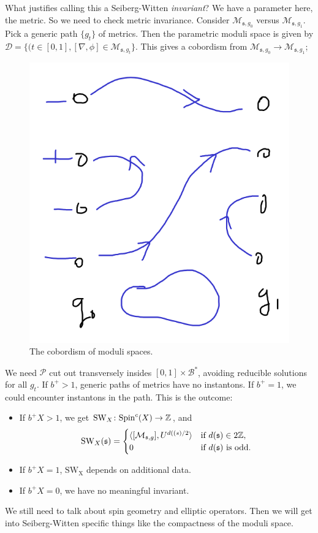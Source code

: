 What justifies calling this a Seiberg-Witten \emph{invariant}? We have a parameter here, the metric. So we need to check metric invariance. Consider $\mathcal M_{\mathfrak s, g_0}$ versus $\mathcal M_{\mathfrak s,g_1}$. Pick a generic path $\{g_t\} $ of metrics. Then the parametric moduli space is given by $\mathcal D = \{(t \in [0,1], [\nabla,\phi] \in \mathcal M _{\mathfrak s, g_t}\} $. This gives a cobordism from $\mathcal M _{\mathfrak s, g_0} \to \mathcal M _{\mathfrak s, g_1}$; 
\begin{figure}[H]
\centering
 \includegraphics[width=0.3\linewidth]{figures/cobord.png}
\caption{The cobordism of moduli spaces.}
\label{cobord}
\end{figure}
We need $\mathcal P$ cut out transversely insides $[0,1] \times \mathcal B^*$, avoiding reducible solutions for all $g_t$. If  $b^+ > 1$, generic paths of metrics have no instantons. If $b^+  = 1$, we could encounter instantons in the path. This is the outcome:
\begin{itemize}
\setlength\itemsep{-.2em}
    \item If $b^+ X> 1$, we get $\mathrm{SW}_X \colon  \mathrm{Sp in}^c (X) \to \mathbb{Z}$, and  
        \[
        \mathrm{SW}_X(\mathfrak s) = 
        \begin{cases}
            \langle [\mathcal M_{\mathfrak s,g}], U ^{d(\mathfrak (s) / 2} \rangle & \text{if } d(\mathfrak s ) \in 2\mathbb{Z},\\
            0 & \text{if } d(\mathfrak s) \text{ is odd.} 
        \end{cases}
        \] 
    \item If $b^+ X = 1$, $\mathrm{SW_X}$ depends on additional data.
    \item If $b^+X = 0$, we have no meaningful invariant.
\end{itemize}
We still need to talk about spin geometry and elliptic operators. Then we will get into Seiberg-Witten specific things like the compactness of the moduli space.



